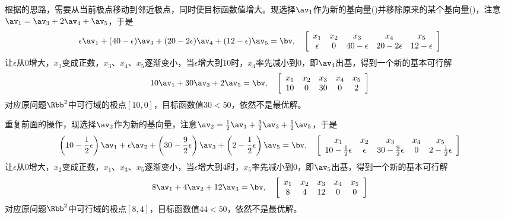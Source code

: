 \documentclass{ctexart}
\begin{document}
\begin{example}
    根据的思路，需要从当前极点移动到邻近极点，同时使目标函数值增大。现选择$\av_1$作为新的基向量()并移除原来的某个基向量()，注意$\av_1 = \av_3 + 2 \av_4 + \av_5$，于是
    \begin{align*}
        \epsilon \av_1 + (40 - \epsilon) \av_3 + (20 - 2 \epsilon) \av_4 + (12 - \epsilon) \av_5 = \bv, \quad
        \left[ \begin{array}{ccccc}
                       x_1      & x_2 & x_3           & x_4             & x_5           \\
                       \epsilon & 0   & 40 - \epsilon & 20 - 2 \epsilon & 12 - \epsilon
                   \end{array} \right]
    \end{align*}
    让$\epsilon$从$0$增大，$x_1$变成正数，$x_3$、$x_4$、$x_5$逐渐变小，当$\epsilon$增大到$10$时，$x_4$率先减小到$0$，即$\av_4$出基，得到一个新的基本可行解
    \begin{align*}
        10 \av_1 + 30 \av_3 + 2 \av_5 = \bv, \quad
        \left[ \begin{array}{ccccc}
                       x_1 & x_2 & x_3 & x_4 & x_5 \\
                       10  & 0   & 30  & 0   & 2
                   \end{array} \right]
    \end{align*}
    对应原问题$\Rbb^2$中可行域的极点$[10,0]$，目标函数值$30 < 50$，依然不是最优解。

    重复前面的操作，现选择$\av_2$作为新的基向量，注意$\av_2 = \frac{1}{2} \av_1 + \frac{9}{2} \av_3 + \frac{1}{2} \av_5$，于是
    \begin{align*}
        \left( 10 - \frac{1}{2} \epsilon \right) \av_1 + \epsilon \av_2 + \left( 30 - \frac{9}{2} \epsilon \right) \av_3 + \left( 2 - \frac{1}{2} \epsilon \right) \av_5 = \bv, \quad
        \left[ \begin{array}{ccccc}
                       x_1                       & x_2      & x_3                       & x_4 & x_5                      \\
                       10 - \frac{1}{2} \epsilon & \epsilon & 30 - \frac{9}{2} \epsilon & 0   & 2 - \frac{1}{2} \epsilon
                   \end{array} \right]
    \end{align*}
    让$\epsilon$从$0$增大，$x_2$变成正数，$x_1$、$x_3$、$x_5$逐渐变小，当$\epsilon$增大到$4$时，$x_5$率先减小到$0$，即$\av_5$出基，得到一个新的基本可行解
    \begin{align*}
        8 \av_1 + 4 \av_2 + 12 \av_3 = \bv, \quad
        \left[ \begin{array}{ccccc}
                       x_1 & x_2 & x_3 & x_4 & x_5 \\
                       8   & 4   & 12  & 0   & 0
                   \end{array} \right]
    \end{align*}
    对应原问题$\Rbb^2$中可行域的极点$[8,4]$，目标函数值$44 < 50$，依然不是最优解。


\end{example}
\end{document}
